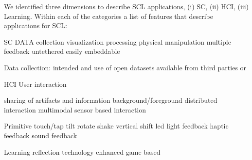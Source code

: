 We identified three dimensions to describe SCL applications, (i) SC, (ii) HCI, (iii) Learning.
Within each of the categories a list of features that describe applications for SCL:

SC
DATA
collection
visualization
processing
physical manipulation
multiple feedback
untethered 
easily embeddable

Data collection: intended and use of open datasets available from third parties or 


HCI
User interaction

sharing of artifacts and information
background/foreground
distributed interaction
multimodal 
sensor based interaction


Primitive
touch/tap
tilt
rotate
shake
vertical shift
led light feedback
haptic feedback
sound feedback


Learning
reflection
technology enhanced
game based
